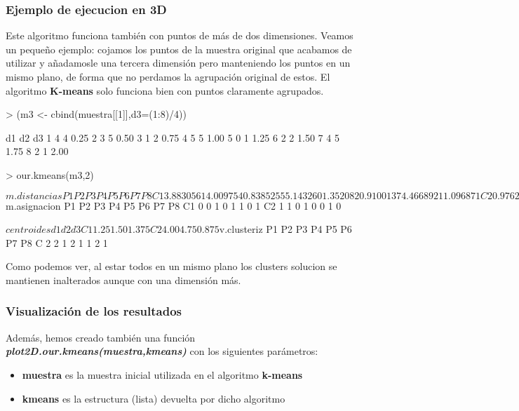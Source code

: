 \documentclass [a4paper] {article}
\begin{document}
\newpage
\subsubsection{Ejemplo de ejecucion en 3D}
Este algoritmo funciona también con puntos de más de dos dimensiones. Veamos un pequeño ejemplo: cojamos los puntos de la muestra original que acabamos de utilizar y añadamosle una tercera dimensión pero manteniendo los puntos en un mismo plano, de forma que no perdamos la agrupación original de estos. El algoritmo \textbf{K-means} solo funciona bien con puntos claramente agrupados.
\begin{Schunk}
\begin{Sinput}
> (m3 <- cbind(muestra[[1]],d3=(1:8)/4))
\end{Sinput}
\begin{Soutput}
  d1 d2   d3
1  4  4 0.25
2  3  5 0.50
3  1  2 0.75
4  5  5 1.00
5  0  1 1.25
6  2  2 1.50
7  4  5 1.75
8  2  1 2.00
\end{Soutput}
\begin{Sinput}
> our.kmeans(m3,2)
\end{Sinput}
\begin{Soutput}
$m.distancias
          P1       P2        P3       P4       P5        P6        P7       P8
C1 3.8830561 4.009754 0.8385255 5.143260 1.352082 0.9100137 4.4668921 1.096871
C2 0.9762812 1.096871 4.0716244 1.038328 5.495737 3.4573292 0.9100137 4.396376

$m.asignacion
   P1 P2 P3 P4 P5 P6 P7 P8
C1  0  0  1  0  1  1  0  1
C2  1  1  0  1  0  0  1  0

$centroides
     d1   d2    d3
C1 1.25 1.50 1.375
C2 4.00 4.75 0.875

$v.clusteriz
  P1 P2 P3 P4 P5 P6 P7 P8
C  2  2  1  2  1  1  2  1
\end{Soutput}
\end{Schunk}

Como podemos ver, al estar todos en un mismo plano los clusters solucion se mantienen inalterados aunque con una dimensión más.

\newpage
\subsubsection{Visualización de los resultados}
Además, hemos creado también una función \textbf{\textit{plot2D.our.kmeans(muestra,kmeans)}} con los siguientes parámetros:
\begin{itemize}
\item \textbf{muestra} es la muestra inicial utilizada en el algoritmo \textbf{k-means}
\item \textbf{kmeans} es la estructura (lista) devuelta por dicho algoritmo
\end{itemize}
\end{document}

